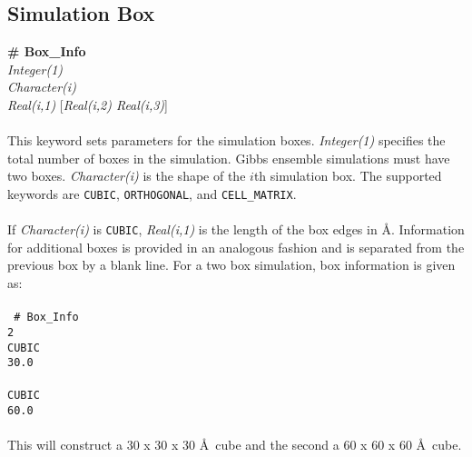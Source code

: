 \subsection{Simulation Box}\label{sec:Box_Info}
{\bf \# Box\_Info} \\
{\it Integer(1)} \\
{\it Character(i)}  \\
{\it Real(i,1)} [{\it Real(i,2) Real(i,3)}] \\ \\
This keyword sets parameters for the simulation boxes. 
{\it Integer(1)} specifies the total number of boxes in the simulation. 
Gibbs ensemble simulations must have two boxes. 
{\it Character(i)} is the shape of the $i$th simulation box. 
The supported keywords are \texttt{CUBIC}, \texttt{ORTHOGONAL}, and \texttt{CELL\_MATRIX}. \\ \\
%
If {\it Character(i)} is \texttt{CUBIC}, \emph{Real(i,1)} is the length of the box edges in \AA. 
Information for additional boxes is provided in an analogous fashion
and is separated from the previous box by a blank line. 
For a two box simulation, box information is given as: \\ \\ 
%
\texttt{
\# Box\_Info \\
 2 \\
 CUBIC \\
 30.0  \\
 \\
 CUBIC \\
 60.0} \\ \\
%
This will construct a 30 x 30 x 30 \AA\ cube and the second a 60 x 60 x 60 \AA\ cube.

